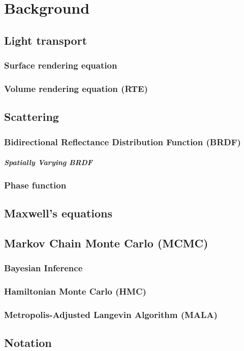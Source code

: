 \chapter{Background}
\label{cpt:background}

\section{Light transport}

\subsection{Surface rendering equation}

\subsection{Volume rendering equation (RTE)}

\section{Scattering}

\subsection{Bidirectional Reflectance Distribution Function (BRDF)}

\paragraph{Spatially Varying BRDF}

\subsection{Phase function}

\section{Maxwell's equations}

\section{Markov Chain Monte Carlo (MCMC)}

\subsection{Bayesian Inference}

\subsection{Hamiltonian Monte Carlo (HMC)}

\subsection{Metropolis-Adjusted Langevin Algorithm (MALA)}

\section{Notation}

%


